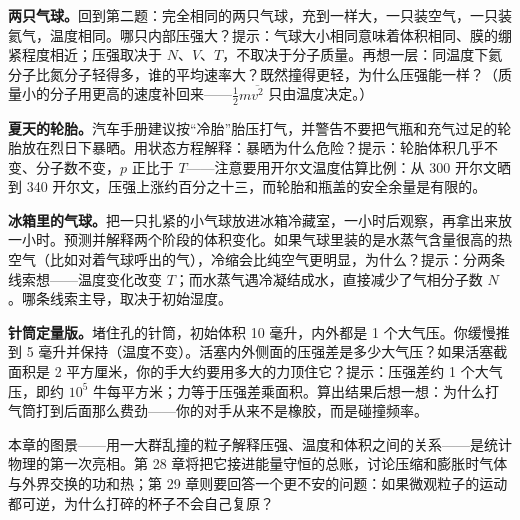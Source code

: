 \begin{puzzles}
\item \textbf{两只气球。}回到第二题：完全相同的两只气球，充到一样大，一只装空气，一只装氦气，温度相同。哪只内部压强大？提示：气球大小相同意味着体积相同、膜的绷紧程度相近；压强取决于 \(N\)、\(V\)、\(T\)，不取决于分子质量。再想一层：同温度下氦分子比氮分子轻得多，谁的平均速率大？既然撞得更轻，为什么压强能一样？（质量小的分子用更高的速度补回来——\(\frac{1}{2}m\overline{v^2}\) 只由温度决定。）

\item \textbf{夏天的轮胎。}汽车手册建议按“冷胎”胎压打气，并警告不要把气瓶和充气过足的轮胎放在烈日下暴晒。用状态方程解释：暴晒为什么危险？提示：轮胎体积几乎不变、分子数不变，\(p\) 正比于 \(T\)——注意要用开尔文温度估算比例：从 300 开尔文晒到 340 开尔文，压强上涨约百分之十三，而轮胎和瓶盖的安全余量是有限的。

\item \textbf{冰箱里的气球。}把一只扎紧的小气球放进冰箱冷藏室，一小时后观察，再拿出来放一小时。预测并解释两个阶段的体积变化。如果气球里装的是水蒸气含量很高的热空气（比如对着气球呼出的气），冷缩会比纯空气更明显，为什么？提示：分两条线索想——温度变化改变 \(T\)；而水蒸气遇冷凝结成水，直接减少了气相分子数 \(N\)。哪条线索主导，取决于初始湿度。

\item \textbf{针筒定量版。}堵住孔的针筒，初始体积 10 毫升，内外都是 1 个大气压。你缓慢推到 5 毫升并保持（温度不变）。活塞内外侧面的压强差是多少大气压？如果活塞截面积是 2 平方厘米，你的手大约要用多大的力顶住它？提示：压强差约 1 个大气压，即约 \(10^5\) 牛每平方米；力等于压强差乘面积。算出结果后想一想：为什么打气筒打到后面那么费劲——你的对手从来不是橡胶，而是碰撞频率。
\end{puzzles}

本章的图景——用一大群乱撞的粒子解释压强、温度和体积之间的关系——是统计物理的第一次亮相。第 28 章将把它接进能量守恒的总账，讨论压缩和膨胀时气体与外界交换的功和热；第 29 章则要回答一个更不安的问题：如果微观粒子的运动都可逆，为什么打碎的杯子不会自己复原？
